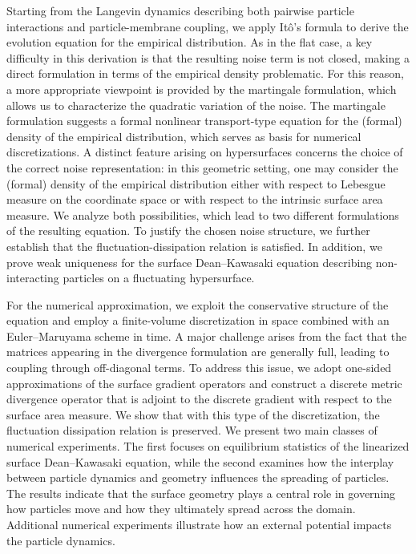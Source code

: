 \documentclass[11pt, a4paper]{article}
\begin{document}
Starting from the Langevin dynamics describing both pairwise particle interactions and particle-membrane coupling, we apply Itô’s formula to derive the evolution equation for the empirical distribution. As in the flat case, a key difficulty in this derivation is that the resulting noise term is not closed, making a direct formulation in terms of the empirical density problematic. For this reason, a more appropriate viewpoint is provided by the martingale formulation, which allows us to characterize the quadratic variation of the noise. The martingale formulation suggests a formal nonlinear transport-type equation for the (formal) density of the empirical distribution, which serves as basis for numerical discretizations. A distinct feature arising on hypersurfaces concerns the choice of the correct noise representation: in this geometric setting, one may consider the (formal) density of the empirical distribution either with respect to Lebesgue measure on the coordinate space or with respect to the intrinsic surface area measure. We analyze both possibilities, which lead to two different formulations of the resulting equation. To justify the chosen noise structure, we further establish that the fluctuation-dissipation relation is satisfied. In addition, we prove weak uniqueness for the surface Dean–Kawasaki equation describing non-interacting particles on a fluctuating hypersurface.


For the numerical approximation, we exploit the conservative structure of the equation and employ a finite-volume discretization in space combined with an Euler--Maruyama scheme in time. A major challenge arises from the fact that the matrices appearing in the divergence formulation are generally full, leading to coupling through off-diagonal terms. To address this issue, we adopt one-sided approximations of the surface gradient operators and construct a discrete metric divergence operator that is adjoint to the discrete gradient with respect to the surface area measure. We show that with this type of the discretization, the fluctuation dissipation relation is preserved. We present two main classes of numerical experiments. The first focuses on equilibrium statistics of the linearized surface Dean--Kawasaki equation, while the second examines how the interplay between particle dynamics and geometry influences the spreading of particles. The results indicate that the surface geometry plays a central role in governing how particles move and how they ultimately spread across the domain. Additional numerical experiments illustrate how an external potential impacts the particle dynamics.
\end{document}
